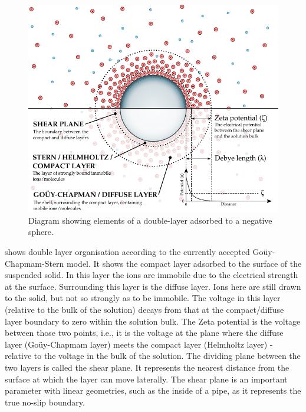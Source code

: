     \begin{figure}
      \begin{center}
        \includegraphics{content/introduction/graphics/doubleLayer_version2}
      \end{center}
      \caption{Diagram showing elements of a double-layer adsorbed to a negative sphere.}
      \label{fig:doubleLayer_anatomy}
    \end{figure}
     shows double layer organisation according to the currently accepted Goüy-Chapmam-Stern model.
    It shows the compact layer adsorbed to the surface of the suspended solid.
    In this layer the ions are immobile due to the electrical strength at the surface.
    Surrounding this layer is the diffuse layer.
    Ions here are still drawn to the solid, but not so strongly as to be immobile.
    The voltage in this layer (relative to the bulk of the solution) decays from that at the compact/diffuse layer boundary to zero within the solution bulk.
    The Zeta potential is the voltage between those two points, i.e., it is the voltage at the plane where the diffuse layer (Goüy-Chapmam layer) meets the compact layer (Helmholtz layer) - relative to the voltage in the bulk of the solution.
    The dividing plane between the two layers is called the shear plane.
    It represents the nearest distance from the surface at which the layer can move laterally.
    The shear plane is an important parameter with linear geometries, such as the inside of a pipe, as it represents the true no-slip boundary.


